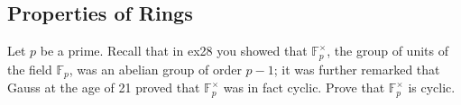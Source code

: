 \subsection{Properties of Rings}
\item Let $p$ be a prime. Recall that in ex28 you showed that $\mathbb{F}_p^{\times}$, the group of units of the field $\mathbb{F}_p$, was an abelian group of order $p-1$; it was further remarked that Gauss at the age of 21 proved that $\mathbb{F}_p^{\times}$ was in fact cyclic. Prove that $\mathbb{F}_p^{\times}$ is cyclic.
